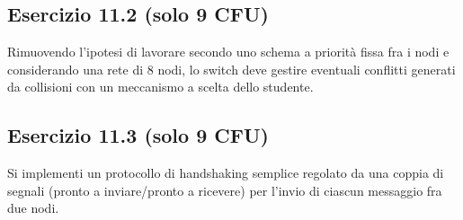 \subsection{Esercizio 11.2 (solo 9 CFU)}

\begin{traccia}
	Rimuovendo l'ipotesi di lavorare secondo uno schema a priorità fissa fra i nodi e
	considerando una rete di 8 nodi, lo switch deve gestire eventuali conflitti generati da
	collisioni con un meccanismo a scelta dello studente.
\end{traccia}


\subsection{Esercizio 11.3 (solo 9 CFU)}

\begin{traccia}
	Si implementi un protocollo di handshaking semplice regolato da una coppia di segnali
	(pronto a inviare/pronto a ricevere) per l'invio di ciascun messaggio fra due nodi.
\end{traccia}

